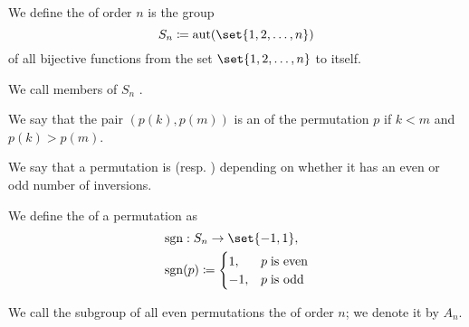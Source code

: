 \begin{definition}\label{def:symmetric_group}
  We define the  of order \( n \) is the group
  \begin{equation*}
    S_n \coloneqq \aut(\set{ 1, 2, \ldots, n })
  \end{equation*}
  of all bijective functions from the set \( \set{ 1, 2, \ldots, n } \) to itself.

  \begin{thmenum}
     We call members of \( S_n \) .

     We say that the pair \( (p(k), p(m)) \) is an  of the permutation \( p \) if \( k < m \) and \( p(k) > p(m) \).

     We say that a permutation is  (resp. ) depending on whether it has an even or odd number of inversions.

     We define the  of a permutation as
    \begin{equation*}
      \begin{aligned}
         &\sgn: S_n \to \set{ -1, 1 }, \\
         &\sgn(p) \coloneqq \begin{cases}
          1,  &p \T{is even} \\
          -1, &p \T{is odd}
        \end{cases}
      \end{aligned}
    \end{equation*}

     We call the subgroup of all even permutations the  of order \( n \); we denote it by \( A_n \).
  \end{thmenum}
\end{definition}

